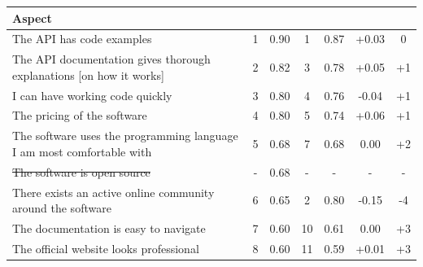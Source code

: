 \documentclass{article}
\begin{document}
\begin{table}[H]
\centering
\begin{tabularx}{\columnwidth}{X|c:c|c:c|c:c|}
\textbf{Aspect} & \textbf{}&\textbf{}&\textbf{}&\textbf{}&\textbf{} & \textbf{} \\ \hline
The API has code examples                                             &                        1 & 0.90                      &                        1 & 0.87                       &       +0.03 &         0    \\ \hline
The API documentation gives thorough explanations [on how it works] &                        2 & 0.82                      &                        3 & 0.78                       &       +0.05 &        +1    \\ \hline
I can have working code quickly                                       &                        3 & 0.80                      &                        4 & 0.76                       &       -0.04 &        +1    \\ \hline
The pricing of the software                                           &                        4 & 0.80                      &                        5 & 0.74                       &       +0.06 &        +1    \\ \hline
The software uses the programming language I am most comfortable with &                        5 & 0.68                      &                        7 & 0.68                       &        0.00 &        +2    \\ \hline
\sout{The software is open source}                                    &                        - & 0.68                      &                        - & -                          &           - &         -    \\ \hline
There exists an active online community around the software           &                        6 & 0.65                      &                        2 & 0.80                       &       -0.15 &        -4    \\ \hline
The documentation is easy to navigate                                 &                        7 & 0.60                      &                       10 & 0.61                       &        0.00 &        +3    \\ \hline
The official website looks professional                               &                        8 & 0.60                      &                       11 & 0.59                       &       +0.01 &        +3    \\ \hline

\end{tabularx}
\end{table}
\end{document}
